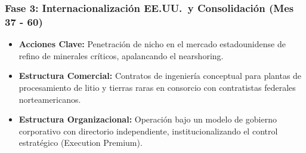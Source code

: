 \subsubsection{Fase 3: Internacionalización EE.UU.\ y Consolidación (Mes 37 - 60)}
\begin{itemize}
    \item \textbf{Acciones Clave:} Penetración de nicho en el mercado estadounidense de refino de minerales críticos, apalancando el nearshoring.
    \item \textbf{Estructura Comercial:} Contratos de ingeniería conceptual para plantas de procesamiento de litio y tierras raras en consorcio con contratistas federales norteamericanos.
    \item \textbf{Estructura Organizacional:} Operación bajo un modelo de gobierno corporativo con directorio independiente, institucionalizando el control estratégico (Execution Premium).
\end{itemize}
